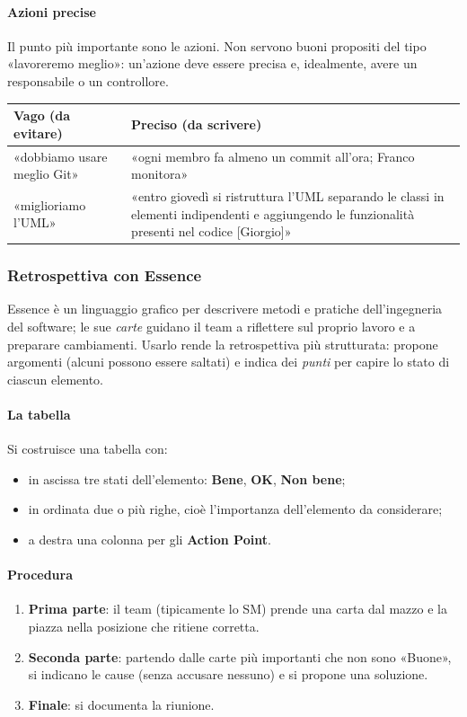 \documentclass[a4paper,12pt]{article}
\begin{document}
\paragraph{Azioni precise}
Il punto più importante sono le azioni. Non servono buoni propositi del tipo «lavoreremo
meglio»: un'azione deve essere precisa e, idealmente, avere un responsabile o un controllore.
\begin{center}
\begin{tabular}{|p{5.2cm}|p{10cm}|}
\hline
\textbf{Vago (da evitare)} & \textbf{Preciso (da scrivere)} \\
\hline
«dobbiamo usare meglio Git» & «ogni membro fa almeno un commit all'ora; Franco monitora» \\
\hline
«miglioriamo l'UML» & «entro giovedì si ristruttura l'UML separando le classi in elementi
indipendenti e aggiungendo le funzionalità presenti nel codice [Giorgio]» \\
\hline
\end{tabular}
\end{center}

\subsubsection{Retrospettiva con Essence}
Essence è un linguaggio grafico per descrivere metodi e pratiche dell'ingegneria del
software; le sue \emph{carte} guidano il team a riflettere sul proprio lavoro e a
preparare cambiamenti. Usarlo rende la retrospettiva più strutturata: propone argomenti
(alcuni possono essere saltati) e indica dei \emph{punti} per capire lo stato di ciascun
elemento.

\paragraph{La tabella}
Si costruisce una tabella con:
\begin{itemize}[nosep]
  \item in ascissa tre stati dell'elemento: \textbf{Bene}, \textbf{OK}, \textbf{Non bene};
  \item in ordinata due o più righe, cioè l'importanza dell'elemento da considerare;
  \item a destra una colonna per gli \textbf{Action Point}.
\end{itemize}

\paragraph{Procedura}
\begin{enumerate}[nosep]
  \item \textbf{Prima parte}: il team (tipicamente lo SM) prende una carta dal mazzo e la
        piazza nella posizione che ritiene corretta.
  \item \textbf{Seconda parte}: partendo dalle carte più importanti che non sono «Buone»,
        si indicano le cause (senza accusare nessuno) e si propone una soluzione.
  \item \textbf{Finale}: si documenta la riunione.
\end{enumerate}
\end{document}
